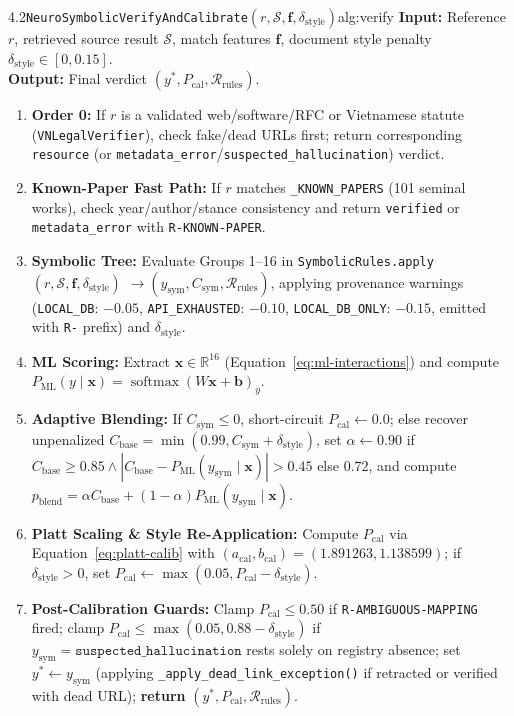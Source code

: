 \begin{citraalgo}{4.2}{\texttt{NeuroSymbolicVerifyAndCalibrate}$(r, \mathcal{S}, \mathbf{f}, \delta_{\text{style}})$}{alg:verify}
\textbf{Input:} Reference $r$, retrieved source result $\mathcal{S}$, match features $\mathbf{f}$, document style penalty $\delta_{\text{style}} \in [0, 0.15]$.\\
\textbf{Output:} Final verdict $(y^*, P_{\text{cal}}, \mathcal{R}_{\text{rules}})$.
{\setlength{\leftmargini}{1.6em}
\begin{enumerate}\setlength{\itemsep}{1pt}\setlength{\parskip}{0pt}
\item \textbf{Order 0:} If $r$ is a validated web/software/RFC or Vietnamese statute (\texttt{VNLegalVerifier}), check fake/dead URLs first; return corresponding \texttt{resource} (or \texttt{metadata\_error}/\texttt{suspected\_hallucination}) verdict.
\item \textbf{Known-Paper Fast Path:} If $r$ matches \texttt{\_KNOWN\_PAPERS} (101 seminal works), check year/author/stance consistency and return \texttt{verified} or \texttt{metadata\_error} with \texttt{R-KNOWN-PAPER}.
\item \textbf{Symbolic Tree:} Evaluate Groups 1--16 in \texttt{SymbolicRules.apply}$(r, \mathcal{S}, \mathbf{f}, \delta_{\text{style}})$ $\rightarrow (y_{\text{sym}}, C_{\text{sym}}, \mathcal{R}_{\text{rules}})$, applying provenance warnings (\texttt{LOCAL\_DB}: $-0.05$, \texttt{API\_EXHAUSTED}: $-0.10$, \texttt{LOCAL\_DB\_ONLY}: $-0.15$, emitted with \texttt{R-} prefix) and $\delta_{\text{style}}$.
\item \textbf{ML Scoring:} Extract $\mathbf{x} \in \mathbb{R}^{16}$ (Equation~\eqref{eq:ml-interactions}) and compute $P_{\text{ML}}(y \mid \mathbf{x}) = \operatorname{softmax}(W\mathbf{x} + \mathbf{b})_y$.
\item \textbf{Adaptive Blending:} If $C_{\text{sym}} \le 0$, short-circuit $P_{\text{cal}} \leftarrow 0.0$; else recover unpenalized $C_{\text{base}} = \min(0.99, C_{\text{sym}} + \delta_{\text{style}})$, set $\alpha \leftarrow 0.90$ if $C_{\text{base}} \ge 0.85 \land |C_{\text{base}} - P_{\text{ML}}(y_{\text{sym}} \mid \mathbf{x})| > 0.45$ else $0.72$, and compute $p_{\text{blend}} = \alpha C_{\text{base}} + (1 - \alpha) P_{\text{ML}}(y_{\text{sym}} \mid \mathbf{x})$.
\item \textbf{Platt Scaling \& Style Re-Application:} Compute $P_{\text{cal}}$ via Equation~\eqref{eq:platt-calib} with $(a_{\text{cal}}, b_{\text{cal}}) = (1.891263, 1.138599)$; if $\delta_{\text{style}} > 0$, set $P_{\text{cal}} \leftarrow \max(0.05, P_{\text{cal}} - \delta_{\text{style}})$.
\item \textbf{Post-Calibration Guards:} Clamp $P_{\text{cal}} \le 0.50$ if \texttt{R-AMBIGUOUS-MAPPING} fired; clamp $P_{\text{cal}} \le \max(0.05, 0.88 - \delta_{\text{style}})$ if $y_{\text{sym}} = \texttt{suspected\_hallucination}$ rests solely on registry absence; set $y^* \leftarrow y_{\text{sym}}$ (applying \texttt{\_apply\_dead\_link\_exception()} if retracted or verified with dead URL); \textbf{return} $(y^*, P_{\text{cal}}, \mathcal{R}_{\text{rules}})$.
\end{enumerate}}
\end{citraalgo}

